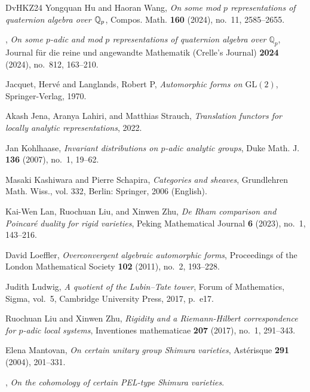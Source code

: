 \documentclass{article}
\theoremstyle{definition}
\begin{document}
\begin{thebibliography}{DvHKZ24}
Yongquan Hu and Haoran Wang, \emph{On some mod {$p$} representations of quaternion algebra over {$\Bbb Q_p$}}, Compos. Math. \textbf{160} (2024), no.~11, 2585--2655. 

\bysame, \emph{{On some $p$-adic and mod $p$ representations of quaternion algebra over $\mathbb{Q}_p$}}, Journal f{\"u}r die reine und angewandte Mathematik (Crelle's Journal) \textbf{2024} (2024), no.~812, 163--210.

{Jacquet, Herv{\'e} and Langlands, Robert P}, \emph{{Automorphic forms on $\mathrm{GL}(2)$}}, Springer-Verlag, 1970.

Akash Jena, Aranya Lahiri, and Matthias Strauch, \emph{Translation functors for locally analytic representations}, 2022.

Jan Kohlhaase, \emph{Invariant distributions on $ p $-adic analytic groups}, Duke Math. J. \textbf{136} (2007), no.~1, 19--62.

Masaki Kashiwara and Pierre Schapira, \emph{Categories and sheaves}, Grundlehren Math. Wiss., vol. 332, Berlin: Springer, 2006 (English).

Kai-Wen Lan, Ruochuan Liu, and Xinwen Zhu, \emph{{De Rham comparison and Poincar{\'e} duality for rigid varieties}}, Peking Mathematical Journal \textbf{6} (2023), no.~1, 143--216.

David Loeffler, \emph{Overconvergent algebraic automorphic forms}, Proceedings of the London Mathematical Society \textbf{102} (2011), no.~2, 193--228.

Judith Ludwig, \emph{{A quotient of the Lubin--Tate tower}}, Forum of Mathematics, Sigma, vol.~5, Cambridge University Press, 2017, p.~e17.

Ruochuan Liu and Xinwen Zhu, \emph{{Rigidity and a Riemann-Hilbert correspondence for $p$-adic local systems}}, Inventiones mathematicae \textbf{207} (2017), no.~1, 291--343.

Elena Mantovan, \emph{{On certain unitary group Shimura varieties}}, Ast{\'e}risque \textbf{291} (2004), 201--331.

\bysame, \emph{{On the cohomology of certain PEL-type Shimura varieties}}.


\end{thebibliography}
\end{document}
